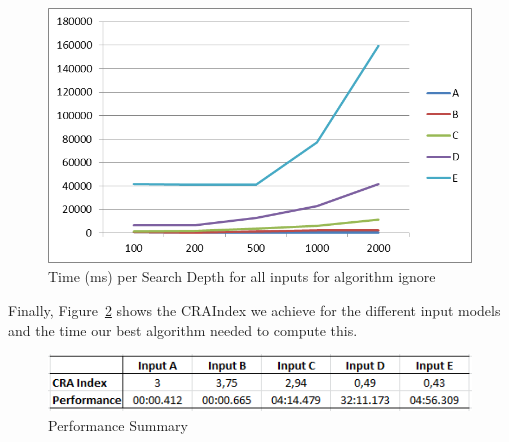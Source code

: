 \documentclass[submission,copyright,creativecommons]{eptcs}
\begin{document}
\begin{figure}[H] \centering
	\includegraphics[width=0.8\linewidth]{Diagramme2-Dateien/image013.png}
 \caption{Time (ms) per Search Depth for all inputs for algorithm ignore}
 \label{fig:TimeByIgnore}
\end{figure}

Finally, Figure~\ref{fig:PerformanceSummary} shows the CRAIndex we achieve for the 
different input models and the time our best algorithm needed to compute this. 

\begin{figure}[H] \centering
	\includegraphics[width=0.8\linewidth]{images/performanceSummary.png}
 \caption{Performance Summary}
 \label{fig:PerformanceSummary}
\end{figure}




  
\end{document}
